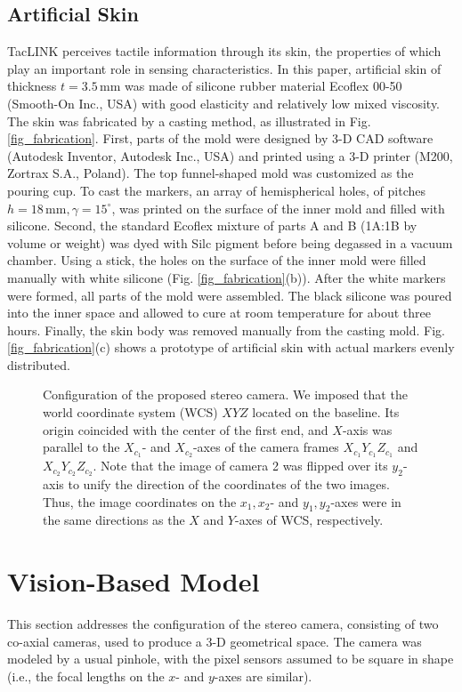 \documentclass[10pt,letterpaper,journal,final,twoside,twocolumn,nofonttune]{IEEEtran}
\begin{document}
\subsection{Artificial Skin}
TacLINK perceives tactile information through its skin, the properties of which play an important role in sensing characteristics. In this paper, artificial skin of thickness $t=3.5\,\text{mm}$ was made of silicone rubber material Ecoflex 00-50 (Smooth-On Inc., USA) with good elasticity and relatively low mixed viscosity. The skin was fabricated by a casting method, as illustrated in Fig. \ref{fig_fabrication}. First, parts of the mold were designed by 3-D CAD software (Autodesk Inventor, Autodesk Inc., USA) and printed using a 3-D printer (M200, Zortrax S.A., Poland). The top funnel-shaped mold was customized as the pouring cup. To cast the markers, an array of hemispherical holes, of  pitches $h=18\,\text{mm}, \gamma=15^\circ$, was printed on the surface of the inner mold and filled with silicone. Second, the standard Ecoflex mixture of parts A and B (1A:1B by volume or weight) was dyed with Silc pigment before being degassed in a vacuum chamber. Using a stick, the holes on the surface of the inner mold were filled manually with white silicone (Fig. \ref{fig_fabrication}(b)). After the white markers were formed, all parts of the mold were assembled. The black silicone was poured into the inner space and allowed to cure at room temperature for about three hours. Finally, the skin body was removed manually from the casting mold. Fig. \ref{fig_fabrication}(c) shows a prototype of artificial skin with actual markers evenly distributed. 
\begin{figure}[!t]
\def\svgwidth{\columnwidth}

\caption{Configuration of the proposed stereo camera. We imposed that the world coordinate system (WCS) $XYZ$ located on the baseline. Its origin coincided with the center of the first end, and $X$-axis was parallel to the $X_{c_1}$- and $X_{c_2}$-axes of the camera frames $X_{c_1}Y_{c_1}Z_{c_1}$ and $X_{c_2}Y_{c_2}Z_{c_2}$. Note that the image of camera 2 was flipped over its $y_2$-axis to unify the direction of the coordinates of the two images. Thus, the image coordinates on the $x_1,x_2$- and $y_1,y_2$-axes were in the same directions as the $X$ and $Y$-axes of WCS, respectively.}
\label{fig_stereo}
\end{figure}
\section{Vision-Based Model}
This section addresses the configuration of the stereo camera, consisting of two co-axial cameras, used to produce a 3-D geometrical space. The camera was modeled by a usual pinhole, with the pixel sensors assumed to be square in shape (i.e., the focal lengths on the $x$- and $y$-axes are similar).
\end{document}
